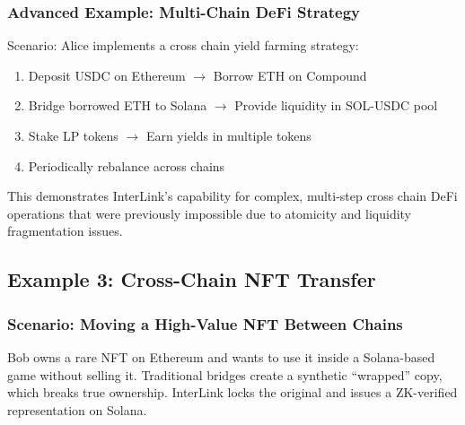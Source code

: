 \documentclass[11pt,a4paper]{article}
\begin{document}
\subsubsection{Advanced Example: Multi-Chain DeFi Strategy}

Scenario: Alice implements a cross chain yield farming strategy:
\begin{enumerate}
    \item Deposit USDC on Ethereum $\rightarrow$ Borrow ETH on Compound
    \item Bridge borrowed ETH to Solana $\rightarrow$ Provide liquidity in SOL-USDC pool
    \item Stake LP tokens $\rightarrow$ Earn yields in multiple tokens
    \item Periodically rebalance across chains
\end{enumerate}

This demonstrates InterLink's capability for complex, multi-step cross chain DeFi operations that were previously impossible due to atomicity and liquidity fragmentation issues.

\subsection{Example 3: Cross-Chain NFT Transfer}

\subsubsection{Scenario: Moving a High-Value NFT Between Chains}

Bob owns a rare NFT on Ethereum and wants to use it inside a Solana-based game without selling it. Traditional bridges create a synthetic ``wrapped'' copy, which breaks true ownership. InterLink locks the original and issues a ZK-verified representation on Solana.
\end{document}
